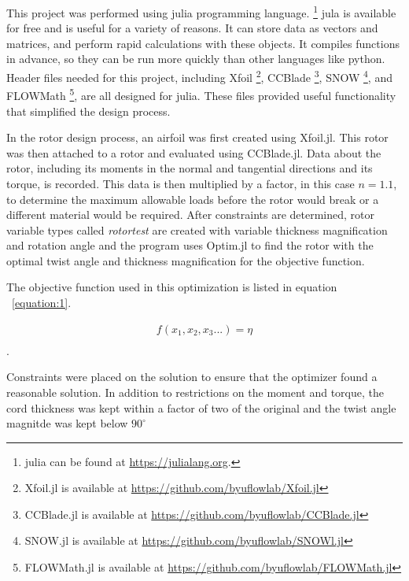 \documentclass[journal ]{new-aiaa}
\begin{document}
This project was performed using julia programming language. \footnote{julia can be found at \url{https://julialang.org}.} jula is available for free and is useful for a variety of reasons. It can store data as vectors and matrices, and perform rapid calculations with these objects. It compiles functions in advance, so they can be run more quickly than other languages like python. Header files needed for this project, including Xfoil \footnote{Xfoil.jl is available at \url{https://github.com/byuflowlab/Xfoil.jl}}, CCBlade \footnote{CCBlade.jl is available at \url{https://github.com/byuflowlab/CCBlade.jl}}, SNOW \footnote{SNOW.jl is available at \url{https://github.com/byuflowlab/SNOWl.jl}}, and FLOWMath \footnote{FLOWMath.jl is available at \url{https://github.com/byuflowlab/FLOWMath.jl}}, are all designed for julia. These files provided useful functionality that simplified the design process.

In the rotor design process, an airfoil was first created using Xfoil.jl. This rotor was then attached to a rotor and evaluated using CCBlade.jl. Data about the rotor, including its moments in the normal and tangential directions and its torque, is recorded. This data is then multiplied by a factor, in this case $n=1.1$, to determine the maximum allowable loads before the rotor would break or a different material would be required. After constraints are determined, rotor variable types called \emph{rotortest} are created with variable thickness magnification and rotation angle and the program uses Optim.jl to find the rotor with the optimal twist angle and thickness magnification for the objective function.

The objective function used in this optimization is listed in equation ~\eqref{equation:1}. 

\begin{equation}
	\begin{aligned}
	\label{equation:1}
	f(x_{1}, x_{2}, x_{3}...) = \eta \\
	\end{aligned}
\end{equation}.

Constraints were placed on the solution to ensure that the optimizer found a reasonable solution. In addition to restrictions on the moment and torque, the cord thickness was kept within a factor of two of the original and the twist angle magnitde was kept below $90^{\circ}$
\end{document}
